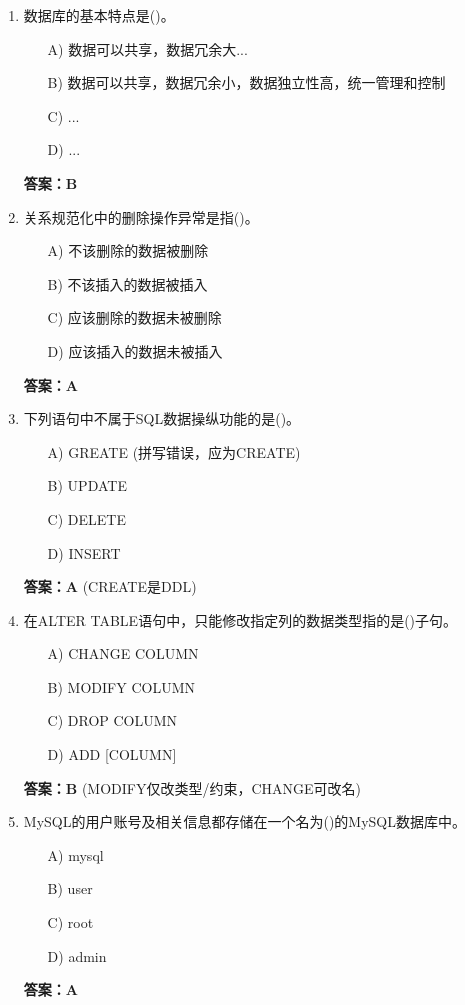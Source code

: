 \documentclass[a4paper,12pt]{article}
\begin{document}
\begin{enumerate}[label=\arabic*.]
\item 数据库的基本特点是()。
\begin{itemize}
    \item[A)] 数据可以共享，数据冗余大...
    \item[B)] 数据可以共享，数据冗余小，数据独立性高，统一管理和控制
    \item[C)] ...
    \item[D)] ...
\end{itemize}
\textbf{答案：B}

\item 关系规范化中的删除操作异常是指()。
\begin{itemize}
    \item[A)] 不该删除的数据被删除
    \item[B)] 不该插入的数据被插入
    \item[C)] 应该删除的数据未被删除
    \item[D)] 应该插入的数据未被插入
\end{itemize}
\textbf{答案：A}

\item 下列语句中不属于SQL数据操纵功能的是()。
\begin{itemize}
    \item[A)] GREATE (拼写错误，应为CREATE)
    \item[B)] UPDATE
    \item[C)] DELETE
    \item[D)] INSERT
\end{itemize}
\textbf{答案：A} (CREATE是DDL)

\item 在ALTER TABLE语句中，只能修改指定列的数据类型指的是()子句。
\begin{itemize}
    \item[A)] CHANGE COLUMN
    \item[B)] MODIFY COLUMN
    \item[C)] DROP COLUMN
    \item[D)] ADD [COLUMN]
\end{itemize}
\textbf{答案：B} (MODIFY仅改类型/约束，CHANGE可改名)

\item MySQL的用户账号及相关信息都存储在一个名为()的MySQL数据库中。
\begin{itemize}
    \item[A)] mysql
    \item[B)] user
    \item[C)] root
    \item[D)] admin
\end{itemize}
\textbf{答案：A}


\end{enumerate}
\end{document}
